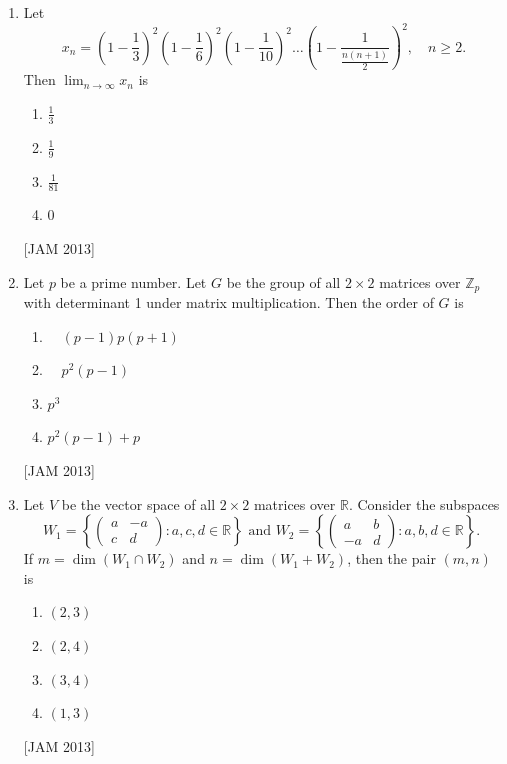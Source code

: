 \begin{enumerate}
\item  Let
$$
x_{n}=\left(1-\frac{1}{3}\right)^{2}\left(1-\frac{1}{6}\right)^{2}\left(1-\frac{1}{10}\right)^{2} \ldots\left(1-\frac{1}{\frac{n(n+1)}{2}}\right)^{2}, \quad n \geq 2 .
$$
Then $\lim _{n \rightarrow \infty} x_{n}$ is 

\begin{enumerate}
 
\item $\frac{1}{3}$ 
\item $\frac{1}{9}$ 
\item $\frac{1}{81}$ 
\item 0
\end{enumerate}
\hfill [JAM 2013]



\item  Let $p$ be a prime number. Let $G$ be the group of all $2 \times 2$ matrices over $\mathbb{Z}_{p}$ with determinant 1 under matrix multiplication. Then the order of $G$ is 

\begin{enumerate}
 \item $\quad(p-1) p(p+1)$ 
\item $\quad p^{2}(p-1)$ 
\item $p^{3}$ 
\item $p^{2}(p-1)+p$
\end{enumerate}
\hfill [JAM 2013]


 \item  Let $V$ be the vector space of all $2 \times 2$ matrices over $\mathbb{R}$. Consider the subspaces
$$
W_{1}=\left\{\left(\begin{array}{cc}
a & -a  \\
c & d
\end{array}\right): a, c, d \in \mathbb{R}\right\} \text { and } W_{2}=\left\{\left(\begin{array}{rr}
a & b  \\
-a & d
\end{array}\right): a, b, d \in \mathbb{R}\right\} \text {. }
$$
If $m=\operatorname{dim}\left(W_{1} \cap W_{2}\right)$ and $n=\operatorname{dim}\left(W_{1}+W_{2}\right)$, then the pair $(m, n)$ is 

\begin{enumerate}
 \item $(2,3)$ 
\item $(2,4)$ 
\item $(3,4)$ 
\item $(1,3)$
\end{enumerate}
\hfill [JAM 2013]





\end{enumerate}
